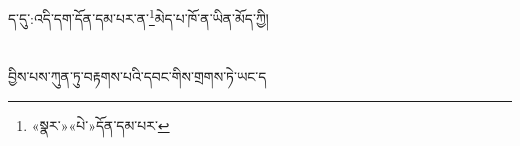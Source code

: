 ད་དུ་:འདི་དག་དོན་དམ་པར་ན་\footnote{«སྣར་»«པེ་»དོན་དམ་པར་}མེད་པ་ཁོ་ན་ཡིན་མོད་ཀྱི།\chapter{ }བྱིས་པས་ཀུན་ཏུ་བརྟགས་པའི་དབང་གིས་གྲགས་ཏེ་ཡང་ད